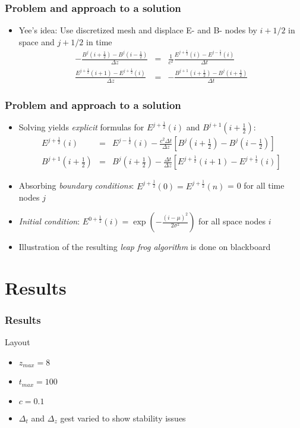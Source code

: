 \documentclass[ignorenonframetext]{beamer}
\begin{document}
\begin{frame}
\frametitle{Problem and approach to a solution}
\begin{itemize}
\item Yee's idea: Use discretized mesh and displace E- and B- nodes by $i + 1/2$ in space and $j + 1/2$ in time 
\begin{eqnarray}
- \frac{B^{j}(i+\frac{1}{2}) - B^{j}(i-\frac{1}{2})}{\Delta z} &=& \frac{1}{c^2} \frac{E^{j+\frac{1}{2}}(i) - E^{j-\frac{1}{2}}(i)}{\Delta t}\nonumber\\
\frac{E^{j+\frac{1}{2}}(i + 1) - E^{j+\frac{1}{2}}(i)}{\Delta z} &=& -\frac{B^{j+1}(i+\frac{1}{2}) - B^{j}(i+\frac{1}{2})}{\Delta t} 
\end{eqnarray}
\begin{figure}
\centering
\caption{}
\label{fig:yee_mesh}
\end{figure}

\end{itemize}
\end{frame}

\begin{frame}
\frametitle{Problem and approach to a solution}
\begin{itemize}
\item Solving yields \emph{explicit} formulas for $E^{j+\frac{1}{2}}(i)$ and $B^{j+1}(i+\frac{1}{2})$:
\begin{eqnarray}
E^{j+\frac{1}{2}}(i)&=& E^{j-\frac{1}{2}}(i) -  \frac{c^2 \Delta t}{\Delta z} \left[B^j(i+\frac{1}{2}) - B^j(i-\frac{1}{2})\right] \nonumber\\
B^{j+1}(i+\frac{1}{2}) &=& B^{j}(i+\frac{1}{2}) - \frac{\Delta t}{\Delta z}\left[E^{j+\frac{1}{2}}(i+1) - E^{j+\frac{1}{2}}(i)\right]
\end{eqnarray}
\item Absorbing \emph{boundary conditions}: $E^{j+\frac{1}{2}}(0) = E^{j+\frac{1}{2}}(n)$ = 0 for all time nodes $j$
\item \emph{Initial condition}: $E^{0+\frac{1}{2}}(i) = \exp\left(-\frac{(i - \mu)^2}{2 \sigma^2}\right)$ for all space nodes $i$
\item Illustration of the resulting \emph{leap frog algorithm} is done on blackboard 
\end{itemize}
\end{frame}

\section{Results}
\begin{frame}
\frametitle{Results}
Layout
\begin{itemize}
\item $z_{max} = 8$
\item $t_{max} = 100$
\item $c = 0.1$
\item $\Delta_t$ and $\Delta_z$ gest varied to show stability issues
\end{itemize}
\end{frame}
\end{document}
